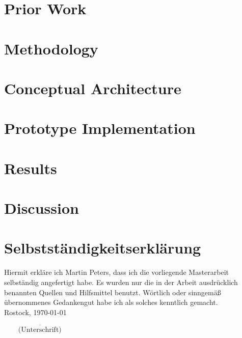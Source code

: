\documentclass[12pt, a4paper, titlepage, oneside]{book}
\newcommand{\thedate}{\today}					%
\begin{document}
	\chapter{Prior Work}
	\label{sec:background:prior-work}
	
	
	\chapter{Methodology}
	\label{sec:methods}
	
	
	\chapter{Conceptual Architecture}
	\label{sec:concept}
	
	
	\chapter{Prototype Implementation}
	\label{sec:impl}
	
	
	\chapter{Results}
	\label{sec:results}
	
	
	\chapter{Discussion}
	\label{sec:discussion}
	
	
	
	\newpage
	
	\chapter*{Selbstständigkeitserklärung}
	Hiermit erkläre ich Martin Peters, dass ich die vorliegende Masterarbeit selbständig angefertigt habe. Es wurden nur die in der Arbeit ausdrücklich benannten Quellen und Hilfsmittel benutzt. Wörtlich oder sinngemäß übernommenes Gedankengut habe ich als solches kenntlich gemacht.
	\\[64pt]
	\noindent Rostock, \thedate
	\begin{flushright}
		$\overline{~~~~~~~~~\mbox{(Unterschrift)}~~~~~~~~~}$
	\end{flushright}
	
\end{document}

